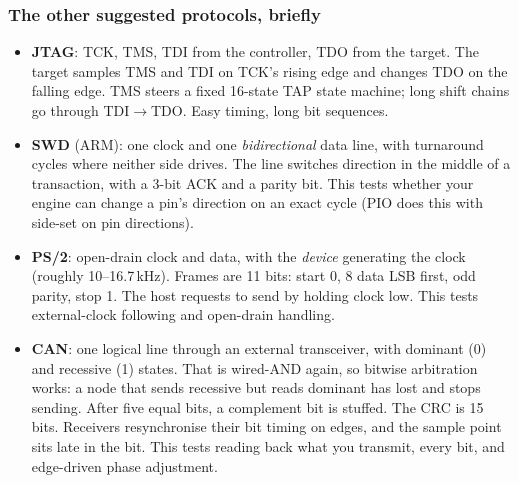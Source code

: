 \subsubsection{The other suggested protocols, briefly}
\begin{itemize}
  \item \textbf{JTAG}: TCK, TMS, TDI from the controller, TDO from the
    target. The target samples TMS and TDI on TCK's rising edge and changes
    TDO on the falling edge. TMS steers a fixed 16-state TAP state machine;
    long shift chains go through TDI$\to$TDO. Easy timing, long bit
    sequences.
  \item \textbf{SWD} (ARM): one clock and one \emph{bidirectional} data
    line, with turnaround cycles where neither side drives. The line
    switches direction in the middle of a transaction, with a 3-bit ACK and
    a parity bit. This tests whether your engine can change a pin's
    direction on an exact cycle (PIO does this with side-set on pin
    directions).
  \item \textbf{PS/2}: open-drain clock and data, with the \emph{device}
    generating the clock (roughly 10--16.7\,kHz). Frames are 11 bits: start
    0, 8 data LSB first, odd parity, stop 1. The host requests to send by
    holding clock low. This tests external-clock following and
    open-drain handling.
  \item \textbf{CAN}: one logical line through an external transceiver, with
    dominant (0) and recessive (1) states. That is wired-AND again, so
    bitwise arbitration works: a node that sends recessive but reads
    dominant has lost and stops sending. After five equal bits, a
    complement bit is stuffed. The CRC is 15 bits. Receivers resynchronise
    their bit timing on edges, and the sample point sits late in the bit.
    This tests reading back what you transmit, every bit, and edge-driven
    phase adjustment.
\end{itemize}

